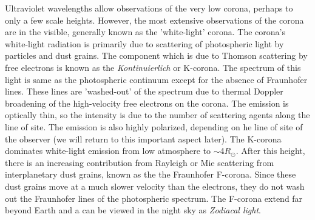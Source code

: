 Ultraviolet wavelengths allow observations of the very low corona, perhaps to only a few scale heights. However, the most extensive observations of the corona are in the visible, generally known as the 'white-light' corona. The corona's white-light radiation is primarily due to scattering of photospheric light by particles and dust grains. The component which is due to Thomson scattering by free electrons is known as the {\it Kontinuierlich} or K-corona. The spectrum of this light is same as the photospheric continuum except for the absence of Fraunhofer lines. These lines are 'washed-out' of the spectrum due to thermal Doppler broadening of the high-velocity free electrons on the corona. The emission is optically thin, so the intensity is due to the number of scattering agents along the line of site. The emission is also highly polarized, depending on he line of site of the observer (we will return to this important aspect later). The K-corona dominates white-light emission from low atmosphere to $\sim$4$R_{\odot}$. After this height, there is an increasing contribution from Rayleigh or Mie scattering from interplanetary dust grains, known as the the Fraunhofer F-corona. Since these dust grains move at a much slower velocity than the electrons, they do not wash out the Fraunhofer lines of the photospheric spectrum. The F-corona extend far beyond Earth and a can be viewed in the night sky as {\it Zodiacal light}.

